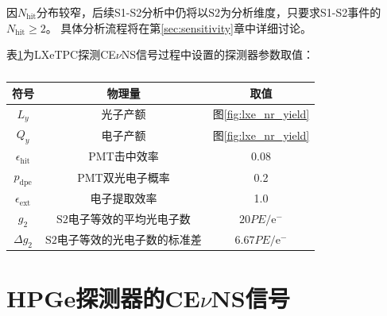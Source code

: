 因$N_\mathrm{hit}$分布较窄，后续S1-S2分析中仍将以$\mathrm{S2}$为分析维度，只要求S1-S2事件的$N_\mathrm{hit}\ge2$。
具体分析流程将在第\ref{sec:sensitivity}章中详细讨论。

表\ref{tab:lxe_tpc_parameters}为LXeTPC探测CE$\nu$NS信号过程中设置的探测器参数取值：

\begin{table}
  \centering
  \caption{}
  \begin{tabular}{c|c|c}
    \toprule
    符号 & 物理量 & 取值 \\
    \midrule
    $L_y$ & 光子产额 & 图\ref{fig:lxe_nr_yield} \\
    $Q_y$ & 电子产额 & 图\ref{fig:lxe_nr_yield} \\
    $\epsilon_\mathrm{hit}$ & PMT击中效率 & 0.08 \\
    $p_\mathrm{dpe}$ & PMT双光电子概率 & 0.2 \\
    $\epsilon_\mathrm{ext}$ & 电子提取效率 & 1.0 \\
    $g_2$ & $\mathrm{S2}$电子等效的平均光电子数 & $20\si{PE/\mathrm{e}^-}$ \\
    $\Delta g_2$ & $\mathrm{S2}$电子等效的光电子数的标准差 & $6.67\si{PE/\mathrm{e}^-}$ \\
    \bottomrule
  \end{tabular}
  \label{tab:lxe_tpc_parameters}
\end{table}

\section{HPGe探测器的CE$\nu$NS信号}
